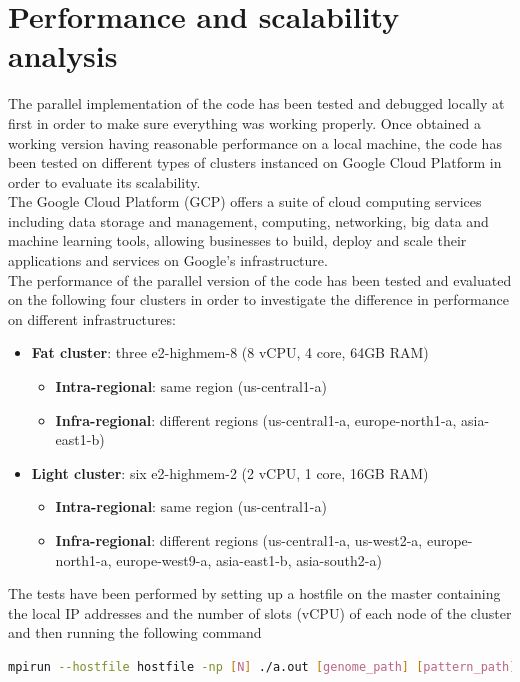 \documentclass[final,5p,times,twocolumn,authoryear]{elsarticle}
\begin{document}
\section{Performance and scalability analysis}
The parallel implementation of the code has been tested and debugged locally at first in order to make sure everything was working properly. Once obtained a working version having reasonable performance on a local machine, the code has been tested on different types of clusters instanced on Google Cloud Platform in order to evaluate its scalability. \\
The Google Cloud Platform (GCP) offers a suite of cloud computing services including data storage and management, computing, networking, big data and machine learning tools, allowing businesses to build, deploy and scale their applications and services on Google's infrastructure. \\
The performance of the parallel version of the code has been tested and evaluated on the following four clusters in order to investigate the difference in performance on different infrastructures:
\begin{itemize}
   \item \textbf{Fat cluster}: three e2-highmem-8 (8 vCPU, 4 core, 64GB RAM)
   \begin{itemize}
       \item \textbf{Intra-regional}: same region (us-central1-a)
       \item \textbf{Infra-regional}: different regions (us-central1-a, europe-north1-a, asia-east1-b)
   \end{itemize}
   \item \textbf{Light cluster}: six e2-highmem-2 (2 vCPU, 1 core, 16GB RAM)
   \begin{itemize}
       \item \textbf{Intra-regional}: same region (us-central1-a)
       \item \textbf{Infra-regional}: different regions (us-central1-a, us-west2-a, europe-north1-a, europe-west9-a, asia-east1-b, asia-south2-a)
   \end{itemize}
\end{itemize}
The tests have been performed by setting up a hostfile on the master containing the local IP addresses and the number of slots (vCPU) of each node of the cluster and then running the following command \\
\begin{lstlisting}[language=bash]
mpirun --hostfile hostfile -np [N] ./a.out [genome_path] [pattern_path]
\end{lstlisting}
\end{document}
